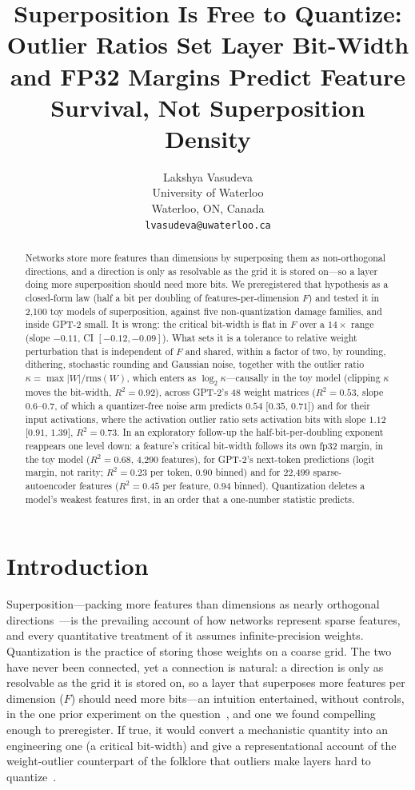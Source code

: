 \documentclass{article}
\title{Superposition Is Free to Quantize: Outlier Ratios Set Layer Bit-Width and FP32 Margins Predict Feature Survival, Not Superposition Density}
\author{Lakshya Vasudeva \\ University of Waterloo \\ Waterloo, ON, Canada \\ \texttt{lvasudeva@uwaterloo.ca}}
\begin{document}
\maketitle

\begin{abstract}
Networks store more features than dimensions by superposing them as non-orthogonal directions, and a direction is only
as resolvable as the grid it is stored on---so a layer doing more superposition should need more bits. We preregistered
that hypothesis as a closed-form law (half a bit per doubling of features-per-dimension $F$) and tested it in 2{,}100
toy models of superposition, against five non-quantization damage families, and inside GPT-2 small. It is wrong:
the critical bit-width is flat in $F$ over a $14\times$ range (slope $-0.11$, CI $[-0.12,-0.09]$). What sets it is a
tolerance to relative weight perturbation that is independent of $F$ and shared, within a factor of two, by rounding,
dithering, stochastic rounding and Gaussian noise, together with the outlier ratio $\kappa=\max|W|/\mathrm{rms}(W)$, which
enters as $\log_2\kappa$---causally in the toy model (clipping $\kappa$ moves the bit-width, $R^2=0.92$), across GPT-2's 48 weight matrices
($R^2=0.53$, slope $0.6$--$0.7$, of which a quantizer-free noise arm predicts $0.54$ [$0.35$, $0.71$]) and for their input
activations, where the activation outlier ratio sets activation bits with slope $1.12$ [$0.91$, $1.39$], $R^2=0.73$. In an exploratory follow-up the half-bit-per-doubling exponent reappears one level down: a feature's critical
bit-width follows its own fp32 margin, in the toy model ($R^2=0.68$, 4{,}290 features), for GPT-2's next-token predictions
(logit margin, not rarity; $R^2 = 0.23$ per token, $0.90$ binned) and for 22{,}499 sparse-autoencoder features ($R^2=0.45$
per feature, $0.94$ binned). Quantization deletes a model's weakest features first, in an order that a one-number
statistic predicts.
\end{abstract}

\section{Introduction}
Superposition---packing more features than dimensions as nearly orthogonal directions~\cite{elhage2022toy}---is the
prevailing account of how networks represent sparse features, and every quantitative treatment of it assumes
infinite-precision weights. Quantization is the practice of storing those weights on a coarse grid. The two have never
been connected, yet a connection is natural: a direction is only as resolvable as the grid it is stored on, so a layer
that superposes more features per dimension ($F$) should need more bits---an intuition entertained, without controls, in
the one prior experiment on the question~\cite{bitnets}, and one we found compelling enough to preregister. If true, it
would convert a mechanistic quantity into an engineering one (a critical bit-width) and give a representational account
of the weight-outlier counterpart of the folklore that outliers make layers hard to quantize~\cite{dettmers2022,xiao2023,lin2024awq}.
\end{document}
